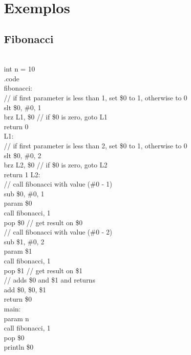 \documentclass[12pt,a4paper,extrafontsizes,article]{memoir}
\newcommand*{\srcfont}{\fontfamily{pcr}\selectfont}
\begin{document}
\clearpage
\chapter{Exemplos}

\section{Fibonacci}

{\srcfont\footnotesize
{}\\
{\color{blue}int} n = {\color{orange}10}\\
{\color{gray}.code}\\
{\color{red}fibonacci:}\\
{\color{green!50!black}// if first parameter is less than 1, set \$0 to 1, otherwise to 0}\\
{\color{violet}slt} \$0, \#0, {\color{orange}1}\\
{\color{violet}brz} L1, \$0 {\color{green!50!black}// if \$0 is zero, goto L1}\\
{\color{violet}return} {\color{orange}0}\\
{\color{red}L1:}\\
{\color{green!50!black}// if first parameter is less than 2, set \$0 to 1, otherwise to 0}\\
{\color{violet}slt} \$0, \#0, {\color{orange}2}\\
{\color{violet}brz} L2, \$0 {\color{green!50!black}// if \$0 is zero, goto L2}\\
{\color{violet}return {\color{orange}1}}
{\color{red}L2:}\\
{\color{green!50!black}// call fibonacci with value (\#0 - 1)}\\
{\color{violet}sub} \$0, \#0, {\color{orange}1}\\ 
{\color{violet}param} \$0\\
{\color{violet}call} fibonacci, {\color{orange}1}\\
{\color{violet}pop} \$0 {\color{green!50!black}// get result on \$0}\\
{\color{green!50!black}// call fibonacci with value (\#0 - 2)}\\
{\color{violet}sub} \$1, \#0, {\color{orange}2}\\
{\color{violet}param} \$1\\
{\color{violet}call} fibonacci, {\color{orange}1}\\
pop \$1 {\color{green!50!black}// get result on \$1}\\
{\color{green!50!black}// adds \$0 and \$1 and returns}\\
{\color{violet}add} \$0, \$0, \$1\\
{\color{violet}return} \$0\\
{\color{red}main:}\\
{\color{violet}param} n\\
{\color{violet}call} fibonacci, {\color{orange}1}\\
{\color{violet}pop} \$0\\
{\color{violet}println} \$0\\
}
\end{document}
